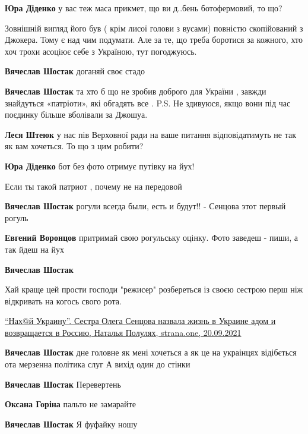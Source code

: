 \begin{itemize}
\begin{itemize}
\textbf{Юра Діденко} у вас теж маса прикмет, що ви д..бень ботофермовий, то що?


Зовнішній вигляд його був ( крім лисої голови з вусами) повністю скопійований з
Джокера. Тому є над чим подумати. Але за те, що треба боротися за кожного, хто
хоч трохи асоціює себе з Україною, тут погоджуюсь.


\textbf{Вячеслав Шостак} доганяй своє стадо

\textbf{Вячеслав Шостак} та хто б що не зробив доброго для України , завжди знайдуться «патріоти», які обгадять все .
P.S. Не здивуюся, якщо вони під час поєдинку більше вболівали за Джошуа.

\textbf{Леся Штеюк} у нас пів Верховної ради на ваше питання відповідатимуть не так як вам хочеться. То що з цим робити?

\textbf{Юра Діденко} бот без фото отримує путівку на йух!

Если ты такой патриот , почему не на передовой

\textbf{Вячеслав Шостак} рогули всегда были, есть и будут!! - Сенцова этот первый рогуль

\textbf{Евгений Воронцов} притримай свою рогульську оцінку.
Фото заведеш - пиши, а так йдеш на йух

\textbf{Вячеслав Шостак} 

Хай краще цей прости господи "режисер" розбереться із своєю сестрою перш ніж
відкривать на когось свого рота. 

\href{https://strana.one/news/354204-sestra-sentsova-nazvala-zhizn-v-ukraine-adom-i-vozvrashchaetsja-v-rossiju.html}{%
\enquote{Нах@й Украину}. Сестра Олега Сенцова назвала жизнь в Украине адом и возвращается в Россию, %
Наталья Полулях, strana.one, 20.09.2021%
}

\textbf{Вячеслав Шостак} дне головне як мені хочеться а як це на украінцях відібється ота мерзенна політика слуг А вихід один до стінки

\textbf{Вячеслав Шостак} Перевертень

\textbf{Оксана Горіна} пальто не замарайте

\textbf{Вячеслав Шостак} Я фуфайку ношу


\end{itemize}
\end{itemize}
